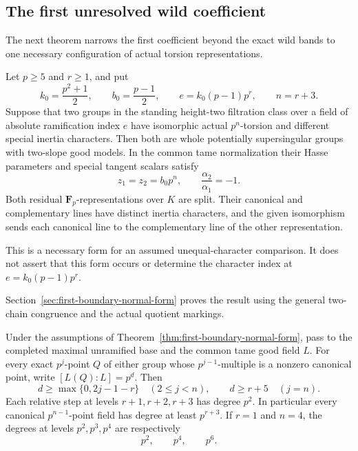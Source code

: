 \subsection{The first unresolved wild coefficient}
The next theorem narrows the first coefficient beyond the exact wild bands to one necessary configuration of actual torsion representations.

\begin{theorem}
\label{thm:first-boundary-normal-form}
Let $p\ge5$ and $r\ge1$, and put
\[
 k_0=\frac{p^2+1}{2},\qquad b_0=\frac{p-1}{2},\qquad
 e=k_0(p-1)p^r,\qquad n=r+3.
\]
Suppose that two groups in the standing height-two filtration class
over a field of absolute ramification index $e$ have isomorphic
actual $p^n$-torsion and different special inertia characters.
Then both are whole potentially supersingular groups with two-slope
good models. In the common tame normalization their Hasse parameters
and special tangent scalars satisfy
\[
 z_1=z_2=b_0p^n,\qquad \frac{\alpha_2}{\alpha_1}=-1.
\]
Both residual $\mathbf F_p$-representations over $K$ are split.
Their canonical and complementary lines have distinct inertia
characters, and the given isomorphism sends each canonical line
to the complementary line of the other representation.
\end{theorem}

This is a necessary form for an assumed unequal-character comparison.
It does not assert that this form occurs or determine the character
index at $e=k_0(p-1)p^r$.

Section~\ref{sec:first-boundary-normal-form} proves the result using the general two-chain congruence and the actual quotient markings.

\begin{corollary}
\label{cor:boundary-point-field-degrees}
Under the assumptions of
Theorem~\ref{thm:first-boundary-normal-form}, pass to the completed
maximal unramified base and the common tame good field $L$.
For every exact $p^j$-point $Q$ of either group whose $p^{j-1}$-multiple is a
nonzero canonical point, write $[L(Q):L]=p^d$. Then
\[
 d\ge\max\{0,2j-1-r\}\quad(2\le j<n),\qquad
 d\ge r+5\quad(j=n).
\]
Each relative step at levels $r+1,r+2,r+3$ has degree $p^2$.
In particular every canonical $p^{n-1}$-point field has degree
at least $p^{r+3}$. If $r=1$ and $n=4$, the degrees at levels
$p^2,p^3,p^4$ are respectively
\[
 p^2,\qquad p^4,\qquad p^6.
\]
\end{corollary}

